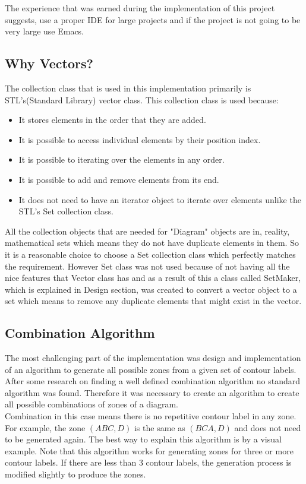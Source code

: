 \documentclass[10pt, a4paper, titlepage]{article}
\begin{document}
The experience that was earned during the implementation of this project suggests, use a proper IDE for large projects and if the project is not going to be very large use Emacs.  


\subsection{Why Vectors?}
\label{vectors}

The collection class that is used in this implementation primarily is STL's(Standard Library) vector class. This collection class is used because:

\begin{itemize}
\item It stores elements in the order that they are added.
\item It is possible to access individual elements by their position index.
\item It is possible to iterating over the elements in any order.
\item It is possible to add and remove elements from its end.
\item It does not need to have an iterator object to iterate over elements unlike the STL's Set collection class. 
\end{itemize}

All the collection objects that are needed for "Diagram" objects are in, reality, mathematical sets which means they do not have duplicate elements in them. So it is a reasonable choice to choose a Set collection class which perfectly matches the requirement. However Set class was not used because of not having all the nice features that Vector class has and as a result of this a class called SetMaker, which is explained in Design section, was created to convert a vector object to a set which means to remove any duplicate elements that might exist in the vector.

\subsection{Combination Algorithm}
The most challenging part of the implementation was design and implementation of an algorithm to generate all possible zones from a given set of contour labels. After some research on finding a well defined combination algorithm no standard algorithm was found. Therefore it was necessary to create an algorithm to create all possible combinations of zones of a diagram. \\
Combination in this case means there is no repetitive contour label in any zone. For example, the zone $ (ABC , D ) $ is the same as $ (BCA, D) $ and does not need to be generated again. The best way to explain this algorithm is by a visual example. Note that this algorithm works for generating zones for three or more contour labels. If there are less than 3 contour labels, the generation process is modified slightly to produce the zones.\\
\end{document}
